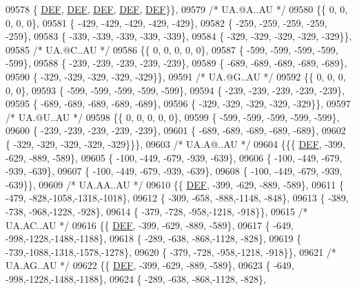 \begin{DoxyCode}
09578 \{  \mbox{\hyperlink{1_88_84__epars_8h_a397419fc12b37ed479c8abb9d444d843}{DEF}},  \mbox{\hyperlink{1_88_84__epars_8h_a397419fc12b37ed479c8abb9d444d843}{DEF}},  \mbox{\hyperlink{1_88_84__epars_8h_a397419fc12b37ed479c8abb9d444d843}{DEF}},  \mbox{\hyperlink{1_88_84__epars_8h_a397419fc12b37ed479c8abb9d444d843}{DEF}},  \mbox{\hyperlink{1_88_84__epars_8h_a397419fc12b37ed479c8abb9d444d843}{DEF}}\}\},
09579 \textcolor{comment}{/* UA.@A..AU */}
09580 \{\{    0,    0,    0,    0,    0\},
09581 \{ -429, -429, -429, -429, -429\},
09582 \{ -259, -259, -259, -259, -259\},
09583 \{ -339, -339, -339, -339, -339\},
09584 \{ -329, -329, -329, -329, -329\}\},
09585 \textcolor{comment}{/* UA.@C..AU */}
09586 \{\{    0,    0,    0,    0,    0\},
09587 \{ -599, -599, -599, -599, -599\},
09588 \{ -239, -239, -239, -239, -239\},
09589 \{ -689, -689, -689, -689, -689\},
09590 \{ -329, -329, -329, -329, -329\}\},
09591 \textcolor{comment}{/* UA.@G..AU */}
09592 \{\{    0,    0,    0,    0,    0\},
09593 \{ -599, -599, -599, -599, -599\},
09594 \{ -239, -239, -239, -239, -239\},
09595 \{ -689, -689, -689, -689, -689\},
09596 \{ -329, -329, -329, -329, -329\}\},
09597 \textcolor{comment}{/* UA.@U..AU */}
09598 \{\{    0,    0,    0,    0,    0\},
09599 \{ -599, -599, -599, -599, -599\},
09600 \{ -239, -239, -239, -239, -239\},
09601 \{ -689, -689, -689, -689, -689\},
09602 \{ -329, -329, -329, -329, -329\}\}\},
09603 \textcolor{comment}{/* UA.A@..AU */}
09604 \{\{\{  \mbox{\hyperlink{1_88_84__epars_8h_a397419fc12b37ed479c8abb9d444d843}{DEF}}, -399, -629, -889, -589\},
09605 \{ -100, -449, -679, -939, -639\},
09606 \{ -100, -449, -679, -939, -639\},
09607 \{ -100, -449, -679, -939, -639\},
09608 \{ -100, -449, -679, -939, -639\}\},
09609 \textcolor{comment}{/* UA.AA..AU */}
09610 \{\{  \mbox{\hyperlink{1_88_84__epars_8h_a397419fc12b37ed479c8abb9d444d843}{DEF}}, -399, -629, -889, -589\},
09611 \{ -479, -828,-1058,-1318,-1018\},
09612 \{ -309, -658, -888,-1148, -848\},
09613 \{ -389, -738, -968,-1228, -928\},
09614 \{ -379, -728, -958,-1218, -918\}\},
09615 \textcolor{comment}{/* UA.AC..AU */}
09616 \{\{  \mbox{\hyperlink{1_88_84__epars_8h_a397419fc12b37ed479c8abb9d444d843}{DEF}}, -399, -629, -889, -589\},
09617 \{ -649, -998,-1228,-1488,-1188\},
09618 \{ -289, -638, -868,-1128, -828\},
09619 \{ -739,-1088,-1318,-1578,-1278\},
09620 \{ -379, -728, -958,-1218, -918\}\},
09621 \textcolor{comment}{/* UA.AG..AU */}
09622 \{\{  \mbox{\hyperlink{1_88_84__epars_8h_a397419fc12b37ed479c8abb9d444d843}{DEF}}, -399, -629, -889, -589\},
09623 \{ -649, -998,-1228,-1488,-1188\},
09624 \{ -289, -638, -868,-1128, -828\},

\end{DoxyCode}
